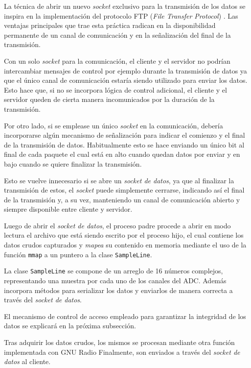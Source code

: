 \documentclass[../../main.tex]{subfiles}
\begin{document}
La técnica de abrir un nuevo \textit{socket} exclusivo para la transmisión de los datos se inspira en la implementación del protocolo FTP (\textit{File Transfer Protocol}) . Las ventajas principales que trae esta práctica radican en la disponibilidad permanente de un canal de comunicación y en la señalización del final de la transmisión.

Con un solo \textit{socket} para la comunicación, el cliente y el servidor no podrían intercambiar mensajes de control por ejemplo durante la transmisión de datos ya que el único canal de comunicación estaría siendo utilizado para enviar los datos. Esto hace que, si no se incorpora lógica de control adicional, el cliente y el servidor queden de cierta manera incomunicados por la duración de la transmisión.

Por otro lado, si se emplease un único \textit{socket} en la comunicación, debería incorporarse algún mecanismo de señalización para indicar el comienzo y el final de la transmisión de datos. Habitualmente esto se hace enviando un único bit al final de cada paquete el cual está en alto cuando quedan datos por enviar y en bajo cuando se quiere finalizar la transmisión. 

Esto se vuelve innecesario si se abre un \textit{socket de datos}, ya que al finalizar la transmisión de estos, el \textit{socket} puede simplemente cerrarse, indicando así el final de la transmisión y, a su vez, manteniendo un canal de comunicación abierto y siempre disponible entre cliente y servidor.

Luego de abrir el \textit{socket de datos}, el proceso padre procede a abrir en modo lectura el archivo que está siendo escrito por el proceso hijo, el cual contiene los datos crudos capturados y \textit{mapea} su contenido en memoria mediante el uso de la función \texttt{mmap}  a un puntero a la clase \texttt{SampleLine}. 

La clase \texttt{SampleLine} se compone de un arreglo de 16 números complejos, representando una muestra por cada uno de los canales del ADC. Además incorpora métodos para serializar los datos y enviarlos de manera correcta a través del \textit{socket de datos}.

El mecanismo de control de acceso empleado para garantizar la integridad de los datos se explicará en la próxima subsección. 

Tras adquirir los datos crudos, los mismos se procesan mediante otra función implementada con GNU Radio 
Finalmente, son enviados a través del \textit{socket de datos} al cliente.
\end{document}
